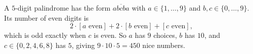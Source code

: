 A $5$-digit palindrome has the form $\overline{abcba}$ with $a\in\{1,\dots,9\}$ and $b,c\in\{0,\dots,9\}$. Its number of even digits is
\[2\cdot[a\text{ even}]+2\cdot[b\text{ even}]+[c\text{ even}],\]
which is odd exactly when $c$ is even. So $a$ has $9$ choices, $b$ has $10$, and $c\in\{0,2,4,6,8\}$ has $5$, giving $9\cdot10\cdot5=\boxed{450}$ nice numbers.
